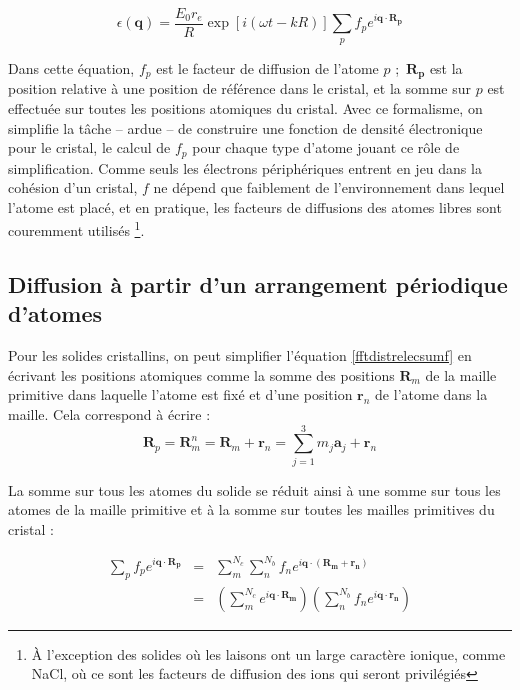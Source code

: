 \begin{equation}
   \epsilon(\mathbf{q}) = \frac{E_0 r_e}{R} \exp [i(\omega t - k R)] \sum_p  f_p e^{i \mathbf{q \cdot R_p}}
    \label{fftdistrelecsumf}
\end{equation}

Dans cette équation, $f_p$ est le facteur de diffusion de l'atome $p$ ; $\mathbf{R_p}$ est la position relative à une position de référence dans le
cristal, et la somme sur $p$ est effectuée sur toutes les positions atomiques du 
cristal. Avec ce formalisme, on simplifie la tâche -- ardue -- de construire une
fonction de densité électronique pour le cristal, le calcul de $f_p$ pour chaque type d'atome jouant ce rôle de simplification.
Comme seuls les électrons périphériques entrent en jeu dans la cohésion d'un
cristal, $f$ ne dépend que faiblement de l'environnement dans lequel l'atome est
placé, et en pratique, les facteurs de diffusions des atomes libres sont
couremment utilisés \footnote{À l'exception des solides où les laisons ont un
    large caractère ionique, comme NaCl, où ce sont les facteurs de diffusion
des ions qui seront privilégiés}.

\subsection{Diffusion à partir d'un arrangement périodique d'atomes}

Pour les solides cristallins, on peut simplifier l'équation
\ref{fftdistrelecsumf} en écrivant les positions atomiques comme la somme des
positions $\mathbf{R}_m$ de la maille primitive dans laquelle l'atome est fixé
et d'une position $\mathbf{r}_n$ de l'atome dans la maille. Cela correspond à
écrire :
\begin{equation}
    \mathbf{R}_p = \mathbf{R}_m^n = \mathbf{R}_m + \mathbf{r}_n =
    \sum_{j=1}^3 m_j \mathbf{a}_j + \mathbf{r}_n
\end{equation}

La somme sur tous les atomes du solide se réduit ainsi à une somme sur tous
les atomes de la maille primitive et à la somme sur toutes les mailles primitives
du cristal :

\begin{eqnarray}
    \sum_p f_p e^{i\mathbf{q \cdot R_p}} & = & \sum_m^{N_c} \sum_n^{N_b}
    f_n e^{i\mathbf{q\cdot(R_m + r_n)}}\\
    & = & \left( \sum_m^{N_c} e^{i\mathbf{q\cdot R_m}} \right)
    \left( \sum_n^{N_b} f_n e^{i\mathbf{q\cdot r_n}} \right)
\end{eqnarray}

